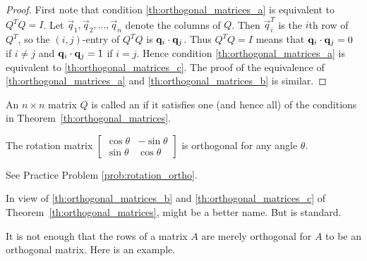 \documentclass{ximera}
\begin{document}
\begin{proof}
First note that condition \ref{th:orthogonal_matrices_a} is equivalent to $Q^{T}Q = I$. Let $\vec{q}_{1}, \vec{q}_{2}, \dots, \vec{q}_{n}$ denote the columns of $Q$. Then $\vec{q}_{i}^{T}$ is the $i$th row of $Q^{T}$, so the $(i, j)$-entry of $Q^{T}Q$ is $\mathbf{q}_{i} \cdot \mathbf{q}_{j}$. Thus $Q^{T}Q = I$ means that $\mathbf{q}_{i} \cdot \mathbf{q}_{j} = 0$ if $i \neq j$ and $\mathbf{q}_{i} \cdot \mathbf{q}_{j} = 1$ if $i = j$. Hence condition \ref{th:orthogonal_matrices_a} is equivalent to \ref{th:orthogonal_matrices_c}. The proof of the equivalence of \ref{th:orthogonal_matrices_a} and \ref{th:orthogonal_matrices_b} is similar.
\end{proof}

\begin{definition}\label{def:orthogonal matrices}
An $n \times n$ matrix $Q$ is called an  if it satisfies one (and hence all) of the conditions in Theorem~\ref{th:orthogonal_matrices}.
\end{definition}


\begin{example}\label{ex:rotation_ortho}
The rotation matrix
$\begin{bmatrix}
\cos\theta & -\sin\theta \\
\sin\theta & \cos\theta
\end{bmatrix}$ is orthogonal for any angle $\theta$.
\begin{explanation}
See Practice Problem \ref{prob:rotation_ortho}.
\end{explanation}
\end{example}

\begin{remark}\label{rem:orthVsOrthnormMat}
In view of \ref{th:orthogonal_matrices_b} and \ref{th:orthogonal_matrices_c} of Theorem~\ref{th:orthogonal_matrices},  might be a better name. But  is standard.
\end{remark}

It is not enough that the rows of a matrix $A$ are merely orthogonal for $A$ to be an orthogonal matrix. Here is an example.
\end{document}
